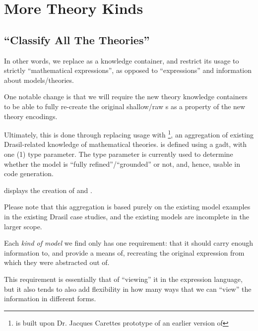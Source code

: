 \chapter{More Theory Kinds}
\label{chap:more-theory-kinds}










\section{\textquotedblleft{}Classify All The Theories\textquotedblright{}}

In other words, we replace \Expr{} as a knowledge container, and restrict its
usage to strictly ``mathematical expressions'', as opposed to ``expressions''
and information about models/theories.

One notable change is that we will require the new theory knowledge containers
to be able to fully re-create the original shallow/raw \Expr{}s as a property of
the new theory encodings.

Ultimately, this is done through replacing \RelationConcept{} usage with
\ModelKind{}\footnote{\ModelKind{} is built upon Dr. Jacques Carettes prototype
    of an earlier version of \ModelKinds{}}, an aggregation of existing
Drasil-related knowledge of mathematical theories. \ModelKind{} is defined using
a \acs{gadt}, with one (1) type parameter. The type parameter is currently used
to determine whether the model is ``fully refined''/``grounded'' or not, and,
hence, usable in code generation.

 displays the creation of \ModelKind{} and
\ModelKinds{}.

Please note that this aggregation is based purely on the existing model examples
in the existing Drasil case studies, and the existing models are incomplete in
the larger scope.

Each \textit{kind of model} we find only has one requirement: that it should
carry enough information to, and provide a means of, recreating the original
expression from which they were abstracted out of.

This requirement is essentially that of ``viewing'' it in the expression
language, but it also tends to also add flexibility in how many ways that we can
``view'' the information in different forms.

